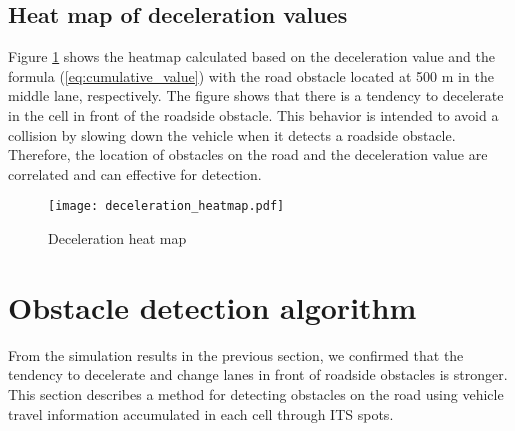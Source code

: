 \documentclass[paper]{ieice}
\begin{document}
\subsection{Heat map of deceleration values}
\label{seq:heat_map_of_deceleration_values}
%
Figure \ref{fig:deceleration_heatmap} shows the heatmap calculated based on the deceleration value and the formula (\ref{eq:cumulative_value}) with the road obstacle located at 500 m in the middle lane, respectively.
%
The figure shows that there is a tendency to decelerate in the cell in front of the roadside obstacle.
%
This behavior is intended to avoid a collision by slowing down the vehicle when it detects a roadside obstacle.
%
Therefore, the location of obstacles on the road and the deceleration value are correlated and can effective for detection.
%
\begin{figure}[tb]
  \centering
  \texttt{[image: deceleration\_heatmap.pdf]}
  \label{fig:deceleration_heatmap}
  \caption{Deceleration heat map}
\end{figure}
%
\section{Obstacle detection algorithm}
\label{sec:obstacle_detection_algorithm}
%
From the simulation results in the previous section, we confirmed that the tendency to decelerate and change lanes in front of roadside obstacles is stronger.
%
This section describes a method for detecting obstacles on the road using vehicle travel information accumulated in each cell through ITS spots.
%


\begin{thebibliography}{99}%
\bibitem{}
\end{thebibliography}

\end{document}
